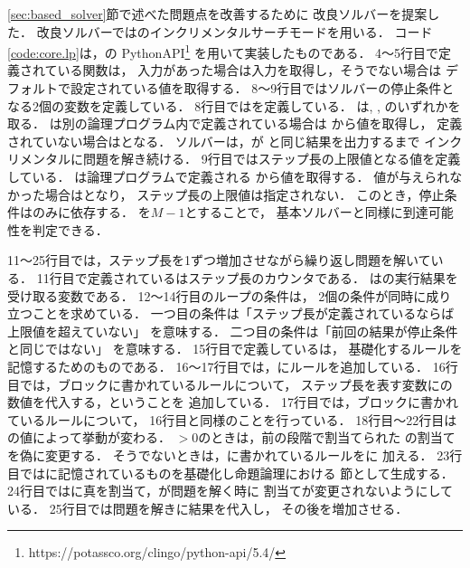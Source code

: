 \ref{sec:based_solver}節で述べた問題点を改善するために
改良ソルバーを提案した．
改良ソルバーでは{\clingo}のインクリメンタルサーチモードを用いる．
コード\ref{code:core.lp}は，{\clingo}の 
PythonAPI\footnote{https://potassco.org/clingo/python-api/5.4/} 
を用いて実装したものである．
4～5行目で定義されている関数は，
入力があった場合は入力を取得し，そうでない場合は
デフォルトで設定されている値を取得する．
8～9行目ではソルバーの停止条件となる2個の変数を定義している．
8行目ではを定義している．
は, , 
のいずれかを取る．
は別の論理プログラム内で定義されている場合は
から値を取得し，
定義されていない場合はとなる．
ソルバーは，{\clingo}が
と同じ結果を出力するまで
インクリメンタルに問題を解き続ける．
9行目ではステップ長の上限値となる値を定義している．
は論理プログラムで定義される
から値を取得する．
値が与えられなかった場合はとなり，
ステップ長の上限値は指定されない．
このとき，停止条件はのみに依存する．
を$M-1$とすることで，
基本ソルバーと同様に到達可能性を判定できる．

11～25行目では，ステップ長を1ずつ増加させながら繰り返し問題を解いている．
11行目で定義されているはステップ長のカウンタである．
は{\clingo}の実行結果を受け取る変数である．
12～14行目のループの条件は，
2個の条件が同時に成り立つことを求めている．
一つ目の条件は「ステップ長が定義されているならば上限値を超えていない」
を意味する．
二つ目の条件は「前回の結果が停止条件と同じではない」
を意味する．
15行目で定義しているは，
基礎化するルールを記憶するためのものである．
16～17行目では，にルールを追加している．
16行目では，ブロックに書かれているルールについて，
ステップ長を表す変数にの数値を代入する，ということを
追加している．
17行目では，ブロックに書かれているルールについて，
16行目と同様のことを行っている．
18行目～22行目はの値によって挙動が変わる．
$ > 0$のときは，前の段階で割当てられた
の割当てを偽に変更する．
そうでないときは，に書かれているルールをに
加える．
23行目ではに記憶されているものを基礎化し命題論理における
節として生成する．
24行目ではに真を割当て，{\clingo}が問題を解く時に
割当てが変更されないようにしている．
25行目では問題を解きに結果を代入し，
その後を増加させる．

